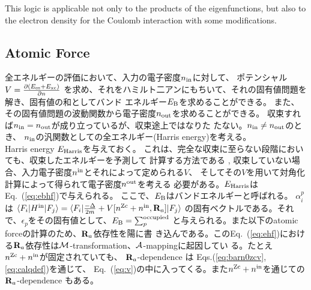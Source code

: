 \documentclass[twocolumn,showpacs,preprintnumbers,amsmath,amssymb,floatfix]{revtex4-1}
\newcommand{\bfR}{{\bf R}}
\def\calR{{\cal A}}
\newcommand{\req}[1]{\mbox{Eq.~\!(\ref{#1})}}
\def\nzc{n^{\rm Zc}}
\def\MM{{\cal M}}
\def\ehf{E_{\rm Harris}}
\def\nin{n^{\rm in}}
\def\nout{n^{\rm out}}
\def\nzc{n^{\rm Zc}}
\def\MM{{\cal M}}
\def\ehf{E_{\rm Harris}}
\def\nin{n^{\rm in}}
\def\nout{n^{\rm out}}
\begin{document}
This logic is applicable not only to the products of the eigenfunctions, 
but also to the electron density for the Coulomb interaction 
with some modifications.



\begin{widetext}
\section{Atomic Force}
\label{sec:force}
全エネルギーの評価において、入力の電子密度$n_{\rm in}$に対して、
ポテンシャル$V=\frac{\partial (E_{\rm es} + E_{\rm xc})}{\partial n}$
を求め、それをハミルト二アンにもちいて、それの固有値問題を解き、固有値の和としてバンド
エネルギー$E_{\rm B}$を求めることができる。
また、その固有値問題の波動関数から電子密度$n_{\rm out}$を求めることができる。
収束すれば$n_{\rm in}=n_{\rm out}$が成り立っているが、収束途上ではなりた
たない。$n_{\rm in}\ne n_{\rm out}$のとき、
$n_{\rm in}$の汎関数としての全エネルギー(Harris energy)を考える。\\

Harris energy $\ehf$を与えておく。
これは、完全な収束に至らない段階においても、収束したエネルギーを予測して
計算する方法である \cite{molforce,harris85},
収束していない場合、入力電子密度$\nin$とそれによって定められる$V$、
そしてその$V$を用いて対角化計算によって得られて電子密度$\nout$を考える
必要がある。$\ehf$は\req{eq:ebhf}で与えられる。
ここで、$E_{\rm B}$はバンドエネルギーと呼ばれる。
$\alpha_i^p$は
$\langle F_i|H^{\rm in}|F_j \rangle=
\langle F_i| \frac{-\Delta}{2m} + V[\nzc+\nin,\bfR_a] |F_j\rangle$
の固有ベクトルである。それで、$\epsilon_p$をその固有値として、$E_{\rm B}=\sum^{\rm occupied}_p$
と与えられる。また以下のatomic forceの計算のため、$\bfR_a$依存性を陽に書
き込んである。この\req{eq:ehf}における$\bfR_a$依存性は$\MM$-transformation、$\calR$-mappingに起因してい
る。たとえ$\nzc+\nin$が固定されていても、
$\bfR_a$-dependence は Eqs.(\ref{eq:barn0zcv},\ref{eq:calqdef})を通じて、
\req{eq:v}の中に入ってくる。また$\nzc+\nin$を通じての$\bfR_a$-dependence
もある。


\end{widetext}
\end{document}
